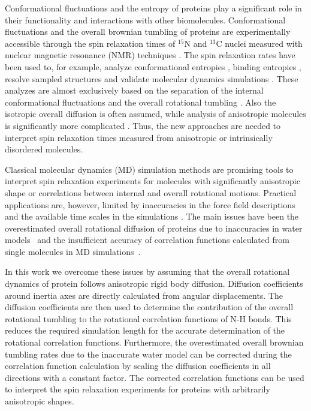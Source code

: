 \documentclass[journal=jpcbfk,manuscript=article]{achemso}
\begin{document}
Conformational fluctuations and the entropy of proteins
play a significant role in their functionality
and interactions with other biomolecules.
Conformational fluctuations and the overall brownian tumbling of proteins
are experimentally accessible through the 
spin relaxation times of $^{15}$N and $^{13}$C nuclei measured
with nuclear magnetic resonance (NMR) 
techniques \cite{jarymowycz06,korzhnev01,mulder01,eisenmesser05,bedem15,lewandowski15,lamley15}. 
The spin relaxation rates have been used to, for example, analyze
conformational entropies \cite{yang96,kasinath13,allner15,jarymowycz06}, binding entropies \cite{akke93,jarymowycz06},
resolve sampled structures \cite{mulder01,eisenmesser05,bedem15,medina14}
and validate molecular dynamics simulations \cite{best04,showalter07a,showalter07b,maragakis08,trbovic08}.
These analyzes are almost exclusively based on the
separation of the internal conformational fluctuations 
and the overall rotational tumbling \cite{wennerstrom79,Lipari82}.
Also the isotropic overall diffusion is often assumed, while
analysis of anisotropic molecules is significantly more
complicated \cite{woessner62,shimizu62,jarymowycz06,korzhnev01,luginbuhl97,hall04}.
Thus, the new approaches are needed to interpret spin relaxation times
measured from anisotropic or intrinsically disordered molecules.

Classical molecular dynamics (MD) simulation methods are
promising tools to interpret spin relaxation experiments
for molecules with significantly anisotropic shape or correlations between
internal and overall rotational motions. Practical applications
are, however, limited by inaccuracies in the force field descriptions
and the available time scales in the simulations \cite{prompers02,maragakis08,trbovic08,wong08,anderson12}.
The main issues have been the overestimated overall rotational diffusion of proteins
due to inaccuracies in water models~\cite{wong08} and the
insufficient accuracy of correlation functions calculated from
single molecules in MD simulations~\cite{lu06,anderson12}.

In this work we overcome these issues by assuming that the overall
rotational dynamics of protein follows anisotropic rigid body diffusion.
Diffusion coefficients around inertia axes are 
directly calculated from angular displacements.
The diffusion coefficients are then used to determine the
contribution of the overall rotational tumbling to the 
rotational correlation functions of N-H bonds.
This reduces the required simulation length for the accurate determination
of the rotational correlation functions. Furthermore, the overestimated
overall brownian tumbling rates due to the inaccurate water model
can be corrected during the correlation function calculation by scaling
the diffusion coefficients in all directions with a constant factor.
The corrected correlation functions can be used to interpret the spin relaxation
experiments for proteins with arbitrarily anisotropic shapes.
\end{document}
